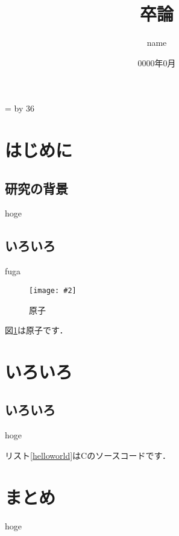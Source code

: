 \documentclass[10pt, a4paper, uplatex]{jsarticle}
\title{卒論} %
\date{0000年0月} %
\author{name} %
\def\linesparpage#1{
    \baselineskip=\textheight
    \divide\baselineskip by #1
}
\newcommand{\figuref}[1]{図\ref{#1}}
\newcommand{\fig}[4][width=\textwidth]{
    \begin{figure}[!h]
        \begin{center}
            \texttt{[image: \#2]}
            \caption{#3}
            \label{#4}
        \end{center}
    \end{figure}
}
\newcommand{\lstref}[1]{リスト\ref{#1}}
\begin{document}
    \linesparpage{36} %

    \begin{titlepage}
        \maketitle
        \thispagestyle{empty}
    \end{titlepage}

    \tableofcontents
    \thispagestyle{empty}
    \newpage

    \setcounter{page}{1}
    \pagestyle{plain}

    \section{はじめに}

        \subsection{研究の背景}
            hoge\cite{hoge}

        \subsection{いろいろ}
            fuga

            \fig{image/atom.jpg}{原子}{atom}

            \figuref{atom}は原子です\cite{irasutoya}．

        \newpage

    \section{いろいろ}

        \subsection{いろいろ}
            hoge
            
            \lstref{helloworld}はCのソースコードです．

        \newpage

    \section{まとめ}
        hoge

        \newpage
\end{document}
